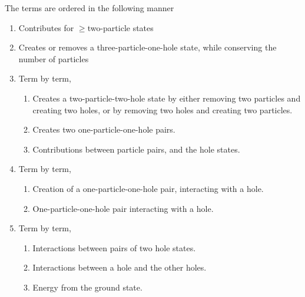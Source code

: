 The terms are ordered in the following manner
\begin{enumerate}[(1).]
    \item Contributes for $\geq$two-particle states
    \item Creates or removes a three-particle-one-hole state, while conserving the number of particles
    \item Term by term,
        \begin{enumerate}
            \item Creates a two-particle-two-hole state by either removing two particles and creating two holes, or by removing two holes and creating two particles.
            \item Creates two one-particle-one-hole pairs.
            \item Contributions between particle pairs, and the hole states.
        \end{enumerate}
    \item Term by term,
        \begin{enumerate}
            \item Creation of a one-particle-one-hole pair, interacting with a hole.
            \item One-particle-one-hole pair interacting with a hole.
        \end{enumerate}
    \item Term by term,
        \begin{enumerate}
            \item Interactions between pairs of two hole states.
            \item Interactions between a hole and the other holes.
            \item Energy from the ground state.
        \end{enumerate}
\end{enumerate}

